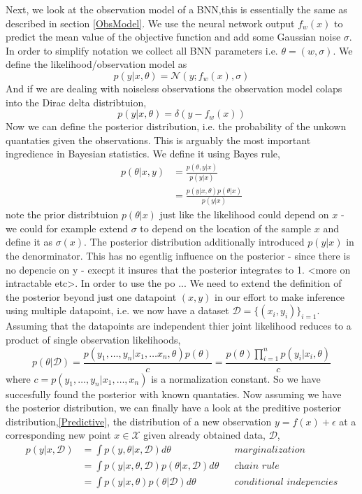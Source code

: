 Next, we look at the observation model of a BNN,this is essentially the same as described in section \ref{ObsModel}. 
We use the neural network output $f_w(x)$ to predict the mean value of the objective function and add some Gaussian noise $\sigma$.
In order to simplify notation we collect all BNN parameters i.e. $\theta = (w,\sigma)$. We define the 
likelihood/observation model as
$$p(y|x,\theta) = \mathcal{N}(y; f_{w}(x),\sigma)$$
And if we are dealing with noiseless observations the observation model colaps into the Dirac delta distribtuion,
$$p(y|x,\theta) = \mathcal{\delta} ( y-f_{w}(x) )$$
Now we can define the posterior distribution, i.e. the probability of the unkown quantaties given the observations. 
This is arguably the most important ingredience in Bayesian statistics. We define it using Bayes rule, 
\begin{align*}
    p(\theta|x,y) &= \frac{p(\theta,y|x)}{p(y|x)}\\
    &=\frac{p(y|x,\theta)p(\theta|x)}{p(y|x)}
\end{align*}
note the prior distribtuion $p(\theta|x)$ just like the likelihood could depend on $x$ - we could for example extend $\sigma$
to depend on the location of the sample $x$ and define it as $\sigma(x)$. The posterior distribution additionally
introduced $p(y|x)$ in the denorminator. This has no egentlig influence on the posterior - since there is no
depencie on y - execpt it insures that the posterior integrates to 1. <more on intractable etc>. In 
order to use the po ...  We need to extend the definition of the posterior beyond just one datapoint $(x,y)$
in our effort to make inference using multiple datapoint, 
i.e. we now have a dataset $\mathcal{D} = \{(x_i,y_i)\}_{i=1}$. 
Assuming that the datapoints are independent thier joint likelihood reduces to a product of single observation
likelihoods, 
$$p(\theta|\mathcal{D}) = \frac{p(y_1,\dots,y_n|x_1,\dots x_n, \theta)p(\theta)}{c} = 
\frac{p(\theta)\prod_{i=1}^n p(y_i|x_i, \theta)}{c} $$
where $c =  p(y_1,\dots,y_n|x_1,\dots,x_n)$ is a normalization constant. So we have succesfully
found the posterior with known quantaties. Now assuming we have the posterior distribution, 
we can finally have a look at the preditive posterior distribution,\eqref{Predictive}, the
distribution of a new observation $y = f(x)+\epsilon$ at a corresponding new point $x \in \mathcal{X}$ given already obtained data, $\mathcal{D}$, 
\begin{align*}
    p(y|x, \mathcal{D}) &= \int p(y,\theta|x,  \mathcal{D}) d\theta &&\textit{marginalization}\\
    &= \int p(y|x, \theta, \mathcal{D}) p(\theta|x, \mathcal{D}) d\theta &&\textit{chain rule} \\
    &= \int p(y|x, \theta) p(\theta| \mathcal{D}) d\theta &&\textit{conditional indepencies}
\end{align*}
